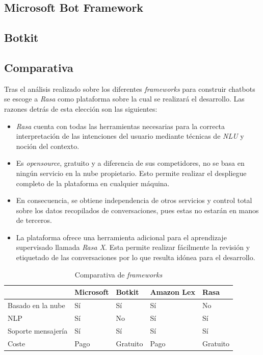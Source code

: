 \subsection{Microsoft Bot Framework}


\subsection{Botkit}



\subsection{Comparativa}

Tras el análisis realizado sobre los diferentes \textit{frameworks} para construir chatbots se escoge a \textit{Rasa} como plataforma sobre la cual se realizará el desarrollo. Las razones detrás de esta elección son las siguientes:\\ 

\begin{itemize}
	\item \textit{Rasa} cuenta con todas las herramientas necesarias para la correcta interpretación de las intenciones del usuario mediante técnicas de \textit{NLU} y noción del contexto.
	\item Es \textit{opensource}, gratuito y a diferencia de sus competidores, no se basa en ningún servicio en la nube propietario. Esto permite realizar el despliegue completo de la plataforma en cualquier máquina. 
	\item  En consecuencia, se obtiene independencia de otros servicios y control total sobre los datos recopilados de conversaciones, pues estas no estarán en manos de terceros.
	\item La plataforma ofrece una herramienta adicional para el aprendizaje supervisado llamada \textit{Rasa X}. Esta permite realizar fácilmente la revisión y etiquetado de las conversaciones por lo que resulta idónea para el desarrollo.
\end{itemize}	

\begin{table}[htbp]
\centering
\begin{tabular}{|l|l|l|l|l|} 
\hline
                   & Microsoft & Botkit   & Amazon Lex & Rasa      \\ 
\hline
Basado en la nube  & Sí        & Sí       & Sí         & No        \\ 
\hline
NLP                & Sí        & No       & Sí         & Sí        \\ 
\hline
Soporte mensajería & Sí        & Sí       & Sí         & Sí        \\ 
\hline
Coste              & Pago      & Gratuito & Pago       & Gratuito  \\
\hline
\end{tabular}
\caption{Comparativa de \textit{frameworks}}
\end{table}

